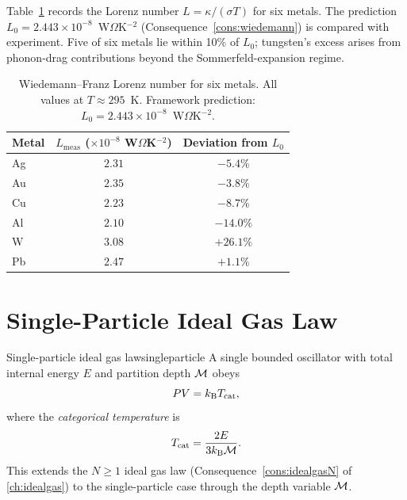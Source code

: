 \begin{remark}
Table~\ref{tab:WF} records the Lorenz number $L = \kappa/(\sigma T)$ for
six metals.  The prediction $L_0 = 2.443 \times 10^{-8}$~W$\Omega$K$^{-2}$
(Consequence~\ref{cons:wiedemann}) is compared with experiment.  Five of
six metals lie within 10\% of $L_0$; tungsten's excess arises from
phonon-drag contributions beyond the Sommerfeld-expansion regime.
\end{remark}

\begin{table}[!htbp]
\centering
\caption{Wiedemann--Franz Lorenz number for six metals.
All values at $T \approx 295$~K.  Framework prediction:
$L_0 = 2.443 \times 10^{-8}$~W$\Omega$K$^{-2}$.}
\label{tab:WF}
\begin{tabular}{lcc}
\toprule
Metal &
  $L_{\mathrm{meas}}$ ($\times 10^{-8}$ W$\Omega$K$^{-2}$) &
  Deviation from $L_0$ \\
\midrule
Ag & $2.31$ & $-5.4\%$ \\
Au & $2.35$ & $-3.8\%$ \\
Cu & $2.23$ & $-8.7\%$ \\
Al & $2.10$ & $-14.0\%$ \\
W  & $3.08$ & $+26.1\%$ \\
Pb & $2.47$ & $+1.1\%$ \\
\bottomrule
\end{tabular}
\end{table}

\section{Single-Particle Ideal Gas Law}
\label{sec:singlepartgas}

\begin{consequence}{Single-particle ideal gas law}{singleparticle}
A single bounded oscillator with total internal energy $E$ and partition
depth $\mathcal{M}$ obeys
\begin{equation}
  PV = k_{\mathrm{B}} T_{\mathrm{cat}},
  \label{eq:spidealgas}
\end{equation}
where the \emph{categorical temperature} is
\begin{equation}
  T_{\mathrm{cat}} = \frac{2E}{3k_{\mathrm{B}} \mathcal{M}}.
  \label{eq:Tcatdepth}
\end{equation}
This extends the $N \ge 1$ ideal gas law (Consequence~\ref{cons:idealgasN}
of \cref{ch:idealgas}) to the single-particle case through the
depth variable $\mathcal{M}$.
\end{consequence}

